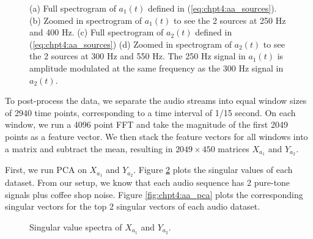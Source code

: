 \begin{figure}
\begin{center}
{    }   
    \caption{(a) Full spectrogram of $a_1(t)$ defined in (\ref{eq:chpt4:aa_sources}). (b)
      Zoomed in spectrogram of $a_1(t)$ to see the 2 sources at 250 Hz and 400 Hz. (c)
      Full spectrogram of $a_2(t)$ defined in (\ref{eq:chpt4:aa_sources}) (d) Zoomed in
      spectrogram of $a_2(t)$ to see the 2 sources at 300 Hz and 550 Hz. The 250 Hz signal
      in $a_1(t)$ is amplitude modulated at the same frequency as the 300 Hz signal in
      $a_2(t)$.}
    \label{fig:chpt4:aa_spectrograms}
  \end{center}
\end{figure}

To post-process the data, we separate the audio streams into equal window sizes of 2940
time points, corresponding to a time interval of 1/15 second. On each window, we run a
4096 point FFT and take the magnitude of the first 2049 points as a feature vector. We
then stack the feature vectors for all windows into a matrix and subtract the mean,
resulting in $2049 \times 450$ matrices $X_{a_1}$ and $Y_{a_2}$.

First, we run PCA on $X_{a_1}$ and $Y_{a_2}$. Figure \ref{fig:chpt4:aa_sv} plots the singular
values of each dataset. From our setup, we know that each audio sequence has 2 pure-tone
signals plus coffee shop noise. Figure \ref{fig:chpt4:aa_pca} plots the corresponding singular
vectors for the top 2 singular vectors of each audio dataset.

\begin{figure}
  \begin{center}
    \caption{Singular value spectra of $X_{a_1}$ and $Y_{a_2}$.}
    \label{fig:chpt4:aa_sv}
  \end{center}
\end{figure}

